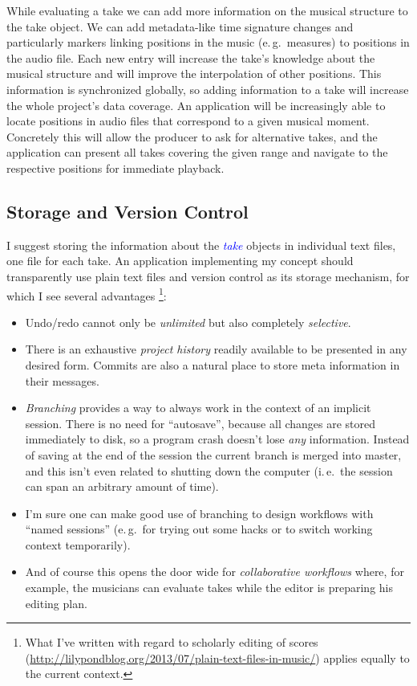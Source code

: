 \documentclass[11pt,a4paper]{article}
\newcommand*{\term}[1]{\textcolor{blue}{\emph{#1}}}
\begin{document}
While evaluating a take we can add more information on the musical structure to
the take object.
We can add metadata-like time signature changes and particularly markers linking
positions in the music (e.\,g.\ measures) to positions in the audio file.
Each new entry will increase the take's knowledge about the musical structure
and will improve the interpolation of other positions.
This information is synchronized globally, so adding information to a take will
increase the whole project's data coverage.
An application will be increasingly able to locate positions in audio files that
correspond to a given musical moment.
Concretely this will allow the producer to ask for alternative takes, and the
application can present all takes covering the given range and navigate to the
respective positions for immediate playback.

\subsection{Storage and Version Control}

I suggest storing the information about the \term{take} objects in individual
text files, one file for each take.
An application implementing my concept should transparently use plain text files
and version control as its storage mechanism, for which I see several
advantages%
\footnote{What I've written with regard to scholarly editing of scores
(\url{http://lilypondblog.org/2013/07/plain-text-files-in-music/}) applies
equally to the current context.}:
\begin{itemize}
\item Undo/redo cannot only be \emph{unlimited} but also completely
\emph{selective}.
\item There is an exhaustive \emph{project history} readily available to be
presented in any desired form.
Commits are also a natural place to store meta information in their messages.
\item \emph{Branching} provides a way to always work in the context of an
implicit session.
There is no need for “autosave”, because all changes are stored immediately to
disk, so a program crash doesn't lose \emph{any} information.
Instead of saving at the end of the session the current branch is merged into
master, and this isn't even related to shutting down the computer (i.\,e.\ the session can span an arbitrary amount of time).
\item I'm sure one can make good use of branching to design workflows with
“named sessions” (e.\,g.\ for trying out some hacks or to switch working context
temporarily).
\item And of course this opens the door wide for \emph{collaborative
workflows} where, for example, the musicians can evaluate takes while the editor
is preparing his editing plan.
\end{itemize}
\end{document}
